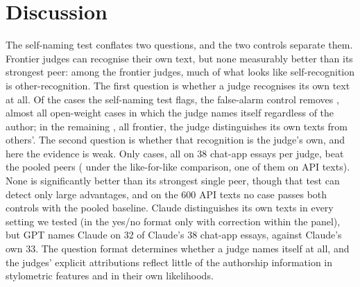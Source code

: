 \section{Discussion}
\label{sec:conclusion}
\label{sec:recs}
\label{sec:limits}

The self-naming test conflates two questions, and the two controls separate
them. Frontier judges can recognise their own text, but none measurably better
than its strongest peer: among the frontier judges, much of what looks like
self-recognition is other-recognition. The first question is whether a judge recognises its own
text at all. Of the \CVflagged{} cases the self-naming test flags, the
false-alarm control removes \CVfailFA{}, almost all open-weight cases in which
the judge names itself regardless of the author; in the remaining \CVdisc{},
all frontier, the judge distinguishes its own texts from others'. The second
question is whether that recognition is the judge's own, and here the evidence
is weak. Only \CVbothAttr{} cases, all on 38 chat-app essays per judge, beat
the pooled peers (\CXLikeForLike{} under the like-for-like comparison, one of
them on API texts). None is significantly better than its strongest single
peer, though that test can detect only large advantages, and on the 600 API
texts no case passes both controls with the pooled baseline. Claude
distinguishes its own texts in every setting we tested (in the yes/no format
only with correction within the panel), but GPT names Claude on 32 of Claude's
38 chat-app essays, against Claude's own 33. The question format determines
whether a judge names itself at all, and the judges' explicit attributions
reflect little of the authorship information in stylometric features and in
their own likelihoods.

